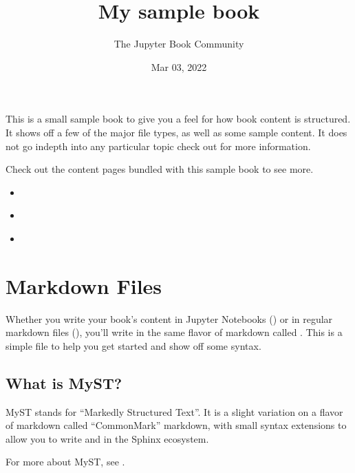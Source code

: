 \documentclass[letterpaper,10pt,english]{jupyterBook}
\title{My sample book}
\date{Mar 03, 2022}
\author{The Jupyter Book Community}
\begin{document}
\pagestyle{empty}
\sphinxmaketitle
\pagestyle{plain}
\sphinxtableofcontents
\pagestyle{normal}
\label{\detokenize{intro::doc}}


\sphinxAtStartPar
This is a small sample book to give you a feel for how book content is
structured.
It shows off a few of the major file types, as well as some sample content.
It does not go in\sphinxhyphen{}depth into any particular topic \sphinxhyphen{} check out  for more information.

\sphinxAtStartPar
Check out the content pages bundled with this sample book to see more.
\begin{itemize}
\item {} 
\sphinxAtStartPar
{\hyperref[\detokenize{markdown::doc}]{}}

\item {} 
\sphinxAtStartPar
{\hyperref[\detokenize{notebooks::doc}]{}}

\item {} 
\sphinxAtStartPar
{\hyperref[\detokenize{markdown-notebooks::doc}]{}}

\end{itemize}


\chapter{Markdown Files}
\label{\detokenize{markdown:markdown-files}}\label{\detokenize{markdown::doc}}
\sphinxAtStartPar
Whether you write your book’s content in Jupyter Notebooks () or
in regular markdown files (), you’ll write in the same flavor of markdown
called .
This is a simple file to help you get started and show off some syntax.


\section{What is MyST?}
\label{\detokenize{markdown:what-is-myst}}
\sphinxAtStartPar
MyST stands for “Markedly Structured Text”. It
is a slight variation on a flavor of markdown called “CommonMark” markdown,
with small syntax extensions to allow you to write  and 
in the Sphinx ecosystem.

\sphinxAtStartPar
For more about MyST, see .
\end{document}
